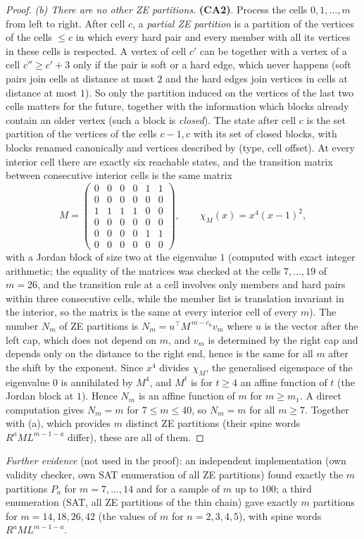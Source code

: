 \begin{proof}
\emph{(b) There are no other ZE partitions.} \textbf{(CA2)}. Process the cells $0,1,\dots,m$ from left to right. After cell $c$, a \emph{partial ZE partition} is a partition of the vertices of the cells $\le c$ in which every hard pair and every member with all its vertices in these cells is respected. A vertex of cell $c'$ can be together with a vertex of a cell $c''\ge c'+3$ only if the pair is soft or a hard edge, which never happens (soft pairs join cells at distance at most $2$ and the hard edges join vertices in cells at distance at most $1$). So only the partition induced on the vertices of the last two cells matters for the future, together with the information which blocks already contain an older vertex (such a block is \emph{closed}). The state after cell $c$ is the set partition of the vertices of the cells $c-1,c$ with its set of closed blocks, with blocks renamed canonically and vertices described by (type, cell offset). At every interior cell there are exactly six reachable states, and the transition matrix between consecutive interior cells is the same matrix
\[
M=\begin{pmatrix}0&0&0&0&1&1\\0&0&0&0&0&0\\1&1&1&1&0&0\\0&0&0&0&0&0\\0&0&0&0&1&1\\0&0&0&0&0&0\end{pmatrix},\qquad\chi_M(x)=x^4(x-1)^2 ,
\]
with a Jordan block of size two at the eigenvalue $1$ (computed with exact integer arithmetic; the equality of the matrices was checked at the cells $7,\dots,19$ of $m=26$, and the transition rule at a cell involves only members and hard pairs within three consecutive cells, while the member list is translation invariant in the interior, so the matrix is the same at every interior cell of every $m$). The number $N_m$ of ZE partitions is $N_m=u^{\top}M^{\,m-c_0}v_m$ where $u$ is the vector after the left cap, which does not depend on $m$, and $v_m$ is determined by the right cap and depends only on the distance to the right end, hence is the same for all $m$ after the shift by the exponent. Since $x^4$ divides $\chi_M$, the generalised eigenspace of the eigenvalue $0$ is annihilated by $M^4$, and $M^{t}$ is for $t\ge4$ an affine function of $t$ (the Jordan block at $1$). Hence $N_m$ is an affine function of $m$ for $m\ge m_1$. A direct computation gives $N_m=m$ for $7\le m\le40$, so $N_m=m$ for all $m\ge7$. Together with (a), which provides $m$ distinct ZE partitions (their spine words $R^aML^{m-1-a}$ differ), these are all of them.
\end{proof}
\emph{Further evidence} (not used in the proof): an independent implementation (own validity checker, own SAT enumeration of all ZE partitions) found exactly the $m$ partitions $P_a$ for $m=7,\dots,14$ and for a sample of $m$ up to $100$; a third enumeration (SAT, all ZE partitions of the thin chain) gave exactly $m$ partitions for $m=14,18,26,42$ (the values of $m$ for $n=2,3,4,5$), with spine words $R^aML^{m-1-a}$.

